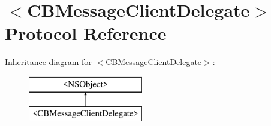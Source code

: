\hypertarget{protocol_c_b_message_client_delegate-p}{\section{$<$C\-B\-Message\-Client\-Delegate$>$ Protocol Reference}
\label{protocol_c_b_message_client_delegate-p}
}
Inheritance diagram for $<$C\-B\-Message\-Client\-Delegate$>$\-:\begin{figure}[H]
\begin{center}
\leavevmode
\includegraphics[height=2.000000cm]{protocol_c_b_message_client_delegate-p}
\end{center}
\end{figure}
